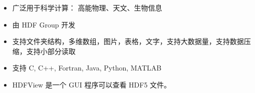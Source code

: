 

\begin{issues}
\issueDraft
\end{issues}

\begin{itemize}
\item 广泛用于科学计算： 高能物理、天文、生物信息
\item 由 HDF Group 开发
\item 支持文件夹结构，多维数组，图片，表格，文字，支持大数据量，支持数据压缩，支持小部分读取
\item 支持 C, C++, Fortran, Java, Python, MATLAB
\item HDFView 是一个 GUI 程序可以查看 HDF5 文件。
\end{itemize}

